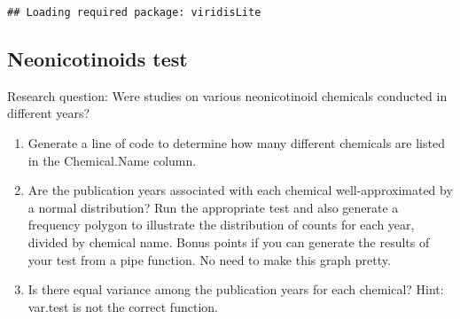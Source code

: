 \documentclass[]{article}
\newenvironment{Shaded}{\begin{snugshade}}{\end{snugshade}}
\newcommand{\KeywordTok}[1]{\textcolor[rgb]{0.13,0.29,0.53}{\textbf{#1}}}
\newcommand{\DataTypeTok}[1]{\textcolor[rgb]{0.13,0.29,0.53}{#1}}
\newcommand{\DecValTok}[1]{\textcolor[rgb]{0.00,0.00,0.81}{#1}}
\newcommand{\StringTok}[1]{\textcolor[rgb]{0.31,0.60,0.02}{#1}}
\newcommand{\CommentTok}[1]{\textcolor[rgb]{0.56,0.35,0.01}{\textit{#1}}}
\newcommand{\OperatorTok}[1]{\textcolor[rgb]{0.81,0.36,0.00}{\textbf{#1}}}
\newcommand{\NormalTok}[1]{#1}
\begin{document}
\begin{verbatim}
## Loading required package: viridisLite
\end{verbatim}

\begin{Shaded}
\end{Shaded}

\subsection{Neonicotinoids test}\label{neonicotinoids-test}

Research question: Were studies on various neonicotinoid chemicals
conducted in different years?

\begin{enumerate}
\def\labelenumi{\arabic{enumi}.}
\setcounter{enumi}{2}
\item
  Generate a line of code to determine how many different chemicals are
  listed in the Chemical.Name column.
\item
  Are the publication years associated with each chemical
  well-approximated by a normal distribution? Run the appropriate test
  and also generate a frequency polygon to illustrate the distribution
  of counts for each year, divided by chemical name. Bonus points if you
  can generate the results of your test from a pipe function. No need to
  make this graph pretty.
\item
  Is there equal variance among the publication years for each chemical?
  Hint: var.test is not the correct function.
\end{enumerate}
\end{document}
